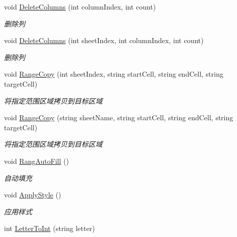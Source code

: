 \begin{DoxyCompactItemize}
void \hyperlink{class_x_c_l_net_tools_1_1_office_1_1_excel_handler_1_1_excel_helper_ac7aaa8ea8f54115213a89c1aecaf4063}{Delete\-Columns} (int column\-Index, int count)
\begin{DoxyCompactList}\small\item\em 删除列 \end{DoxyCompactList}\item 
void \hyperlink{class_x_c_l_net_tools_1_1_office_1_1_excel_handler_1_1_excel_helper_ace21012f5684de3daa81e9869ddf2183}{Delete\-Columns} (int sheet\-Index, int column\-Index, int count)
\begin{DoxyCompactList}\small\item\em 删除列 \end{DoxyCompactList}\item 
void \hyperlink{class_x_c_l_net_tools_1_1_office_1_1_excel_handler_1_1_excel_helper_aad980390731bd9f89b354593431c90af}{Range\-Copy} (int sheet\-Index, string start\-Cell, string end\-Cell, string target\-Cell)
\begin{DoxyCompactList}\small\item\em 将指定范围区域拷贝到目标区域 \end{DoxyCompactList}\item 
void \hyperlink{class_x_c_l_net_tools_1_1_office_1_1_excel_handler_1_1_excel_helper_a5bb84e8bacd04617b991c45e6dbd9edc}{Range\-Copy} (string sheet\-Name, string start\-Cell, string end\-Cell, string target\-Cell)
\begin{DoxyCompactList}\small\item\em 将指定范围区域拷贝到目标区域 \end{DoxyCompactList}\item 
void \hyperlink{class_x_c_l_net_tools_1_1_office_1_1_excel_handler_1_1_excel_helper_a22547178f56c46f8d2feda22046e685b}{Rang\-Auto\-Fill} ()
\begin{DoxyCompactList}\small\item\em 自动填充 \end{DoxyCompactList}\item 
void \hyperlink{class_x_c_l_net_tools_1_1_office_1_1_excel_handler_1_1_excel_helper_af2d165d931af0110263a12fcbb0c5cb2}{Apply\-Style} ()
\begin{DoxyCompactList}\small\item\em 应用样式 \end{DoxyCompactList}\item 
int \hyperlink{class_x_c_l_net_tools_1_1_office_1_1_excel_handler_1_1_excel_helper_ad9a762e98014d248246dc38122cdea64}{Letter\-To\-Int} (string letter)

\end{DoxyCompactItemize}
